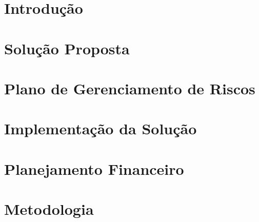 % 



\chapter{Introdução} %


\chapter{Solução Proposta} %

\label{cha:solucao}


\chapter{Plano de Gerenciamento de Riscos}

\label{cha:riscos}

\chapter{Implementação da Solução}

\label{cha:solucao2}

\chapter{Planejamento Financeiro}


\chapter{Metodologia}

\label{cha:metodologia}
